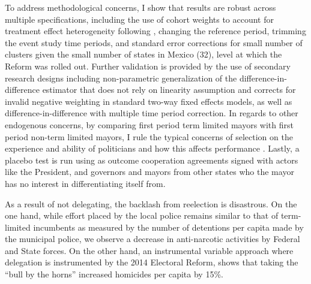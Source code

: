 \documentclass[12pt]{amsart}
\numberwithin{equation}{section}
\theoremstyle{definition}
\theoremstyle{definition}
\theoremstyle{definition}
\begin{document}
To address methodological concerns, I show that results are robust across multiple specifications, including the use of cohort weights to account for treatment effect heterogeneity following \citet{abraham_sun_2020}, changing the reference period, trimming the event study time periods, and standard error corrections for small number of clusters given the small number of states in Mexico (32), level at which the Reform was rolled out. Further validation is provided by the use of secondary research designs including \citet{imai_etal_2020} non-parametric generalization of the difference-in-difference estimator that does not rely on linearity assumption and corrects for invalid negative weighting in standard two-way fixed effects models, as well as \citet{chaisemarting_etal_2019} difference-in-difference with multiple time period correction. In regards to other endogenous concerns, by comparing first period term limited mayors with first period non-term limited mayors, I rule the typical concerns of selection on the experience and ability of politicians \citep{samuelson_1984, dalbo_etal_2017} and how this affects performance \citep{ferraz_finan_2011}. Lastly, a placebo test is run using as outcome cooperation agreements signed with actors like the President, and governors and mayors from other states who the mayor has no interest in differentiating itself from.%



As a result of not delegating, the backlash from reelection is disastrous. On the one hand, while effort placed by the local police remains similar to that of term-limited incumbents as measured by the number of detentions per capita made by the municipal police, we observe a decrease in anti-narcotic activities by Federal and State forces. On the other hand, an instrumental variable approach where delegation is instrumented by the 2014 Electoral Reform, shows that taking the ``bull by the horns'' increased homicides per capita by 15\%. 
\end{document}
